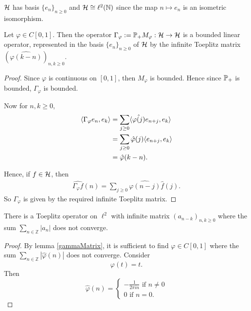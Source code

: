 \documentclass{unswmaths}
\begin{document}
\begin{remark}
    $\mathcal{H}$ has basis $\{e_n\}_{n\geq 0}$ and $\mathcal{H} \cong \ell^2(\mathbb{N})$
    since the map $n\mapsto e_n$ is an isometric isomorphism.
\end{remark}
\begin{lemma}
\label{gammaMatrix}
    Let $\varphi \in C[0,1]$. Then the operator $\Gamma_\varphi := \mathbb{P}_+ M_\varphi :\mathcal{H}\rightarrow\mathcal{H}$
    is a bounded linear operator, represented in the basis $\{e_n\}_{n\geq 0}$
    of $\mathcal{H}$ by the infinite Toeplitz matrix $(\hat{\varphi(k-n)})_{n,k\geq 0}$.
\end{lemma}
\begin{proof}
    Since $\varphi$ is continuous on $[0,1]$, then $M_\varphi$ is bounded. Hence since $\mathbb{P}_+$
    is bounded, $\Gamma_\varphi$ is bounded. 
    
    Now for $n,k\geq 0$,
    \begin{align*}
        \langle \Gamma_\varphi e_n,e_k\rangle &= \sum_{j\geq0} \langle \hat{\varphi(j)}e_{n+j},e_k\rangle\\
        &= \sum_{j\geq 0} \hat{\varphi}(j) \langle e_{n+j},e_k\rangle\\
        &= \hat{\varphi}(k-n).
    \end{align*}
    
    Hence, if $f \in \mathcal{H}$, then
    \begin{align*}
        \widehat{\Gamma_\varphi f}(n) = \sum_{j\geq 0} \hat{\varphi(n-j)}\hat{f}(j).
    \end{align*}
    So $\Gamma_\varphi$ is given by the required infinite Toeplitz matrix.
\end{proof}
\begin{theorem}
    There is a Toeplitz operator on $\ell^2$ with infinite matrix $(a_{n-k})_{n,k\geq 0}$
    where the sum $\sum_{n\in \mathbb{Z}} |a_n|$ does not converge.
\end{theorem}
\begin{proof}
    By lemma \ref{gammaMatrix}, it is sufficient to find $\varphi \in C[0,1]$
    where the sum $\sum_{n\in \mathbb{Z}} |\hat{\varphi}(n)|$
    does not converge.
    Consider
    \begin{equation*}
        \varphi(t) = t.
    \end{equation*}
    Then
    \begin{equation*}
        \hat{\varphi}(n) = \begin{cases}
            -\frac{1}{2\pi i n}\text{ if }n\neq 0\\
            0\text{ if }n = 0.
        \end{cases}
    \end{equation*}
\end{proof}
\end{document}
